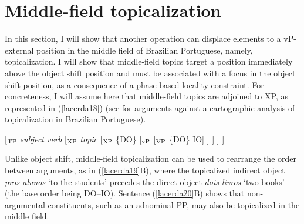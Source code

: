 \documentclass[output=paper]{langscibook}
\begin{document}
\section{Middle-field topicalization}

In this section, I will show that another operation can displace elements to a vP-external position in the middle field of Brazilian Portuguese, namely, topicalization. I will show that middle-field topics target a position immediately above the object shift position and must be associated with a focus in the object shift position, as a consequence of a phase-based locality constraint. For concreteness, I will assume here that middle-field topics are adjoined to XP, as represented in (\ref{lacerda18}) (see \citealt{Lacerda2019,Lacerda2020a,Lacerda2020b} for arguments against a cartographic analysis of topicalization in Brazilian Portuguese).

\begin{exe}
\ex \label{lacerda18}
[$_{\textnormal{TP}}$ \emph{subject verb} [$_{\textnormal{XP}}$ \emph{topic} [$_{\textnormal{XP}}$ \{DO\} [$_{\textnormal{vP}}$ [$_{\textnormal{VP}}$ \{DO\} IO] ] ] ] ]
\end{exe}

Unlike object shift, middle-field topicalization can be used to rearrange the order between arguments, as in (\ref{lacerda19}B), where the topicalized indirect object \emph{pros alunos} ‘to the students’ precedes the direct object \emph{dois livros} ‘two books’ (the base order being DO–IO). Sentence (\ref{lacerda20}B) shows that non-argumental constituents, such as an adnominal PP, may also be topicalized in the middle field.
\end{document}

